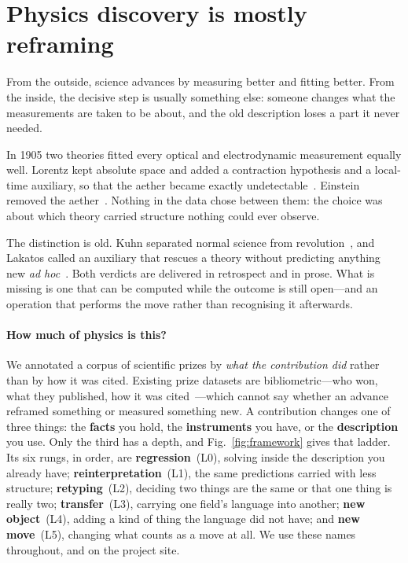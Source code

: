 \documentclass[aps,pra,twocolumn,superscriptaddress,nofootinbib,10pt]{revtex4-2}
\begin{document}
\section{Physics discovery is mostly reframing}

From the outside, science advances by measuring better and fitting better. From the inside, the
decisive step is usually something else: someone changes what the measurements are taken to be
about, and the old description loses a part it never needed.

In 1905 two theories fitted every optical and electrodynamic measurement equally well. Lorentz
kept absolute space and added a contraction hypothesis and a local-time auxiliary, so that the
aether became exactly undetectable~\cite{lorentz1904electromagnetic}. Einstein removed the
aether~\cite{einstein1905electrodynamics}. Nothing in the data chose between them: the choice was
about which theory carried structure nothing could ever observe.

The distinction is old. Kuhn separated normal science from revolution~\cite{kuhn1962structure},
and Lakatos called an auxiliary that rescues a theory without predicting anything new \emph{ad
hoc}~\cite{lakatos1970falsification}. Both verdicts are delivered in retrospect and in prose.
What is missing is one that can be computed while the outcome is still open---and an operation
that performs the move rather than recognising it afterwards.

\paragraph{How much of physics is this?} We annotated a corpus of scientific prizes by
\emph{what the contribution did} rather than by how it was cited. Existing prize datasets are
bibliometric---who won, what they published, how it was cited~\cite{li2019nobel}---which cannot
say whether an advance reframed something or measured something new. A contribution changes one of
three things: the \textbf{facts} you hold, the \textbf{instruments} you have, or the
\textbf{description} you use. Only the third has a depth, and Fig.~\ref{fig:framework} gives that
ladder. Its six rungs, in order, are \textbf{regression}~(L0), solving inside the description you
already have; \textbf{reinterpretation}~(L1), the same predictions carried with less structure;
\textbf{retyping}~(L2), deciding two things are the same or that one thing is really two;
\textbf{transfer}~(L3), carrying one field's language into another; \textbf{new object}~(L4),
adding a kind of thing the language did not have; and \textbf{new move}~(L5), changing what
counts as a move at all. We use these names throughout, and on the project site.
\end{document}
